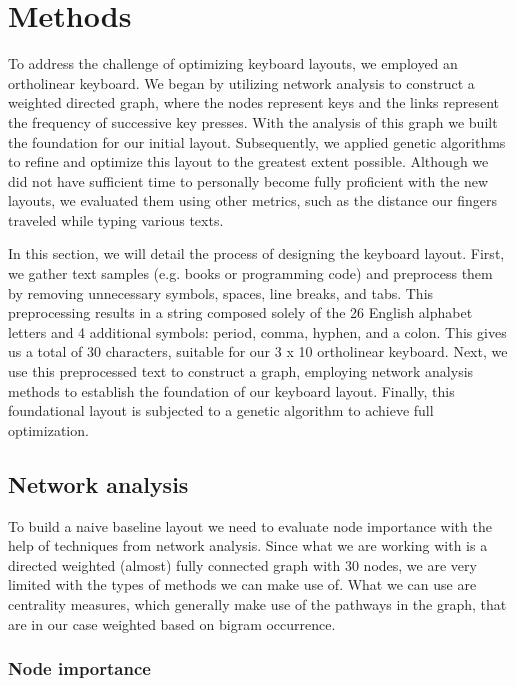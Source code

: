 \documentclass[9pt,twocolumn,twoside]{pnas-report}
\begin{document}
{\small

\section*{Methods}

To address the challenge of optimizing keyboard layouts, we employed an ortholinear keyboard.
We began by utilizing network analysis to construct a weighted directed graph, where the nodes represent keys and the links represent the frequency of successive key presses.
With the analysis of this graph we built the foundation for our initial layout.
Subsequently, we applied genetic algorithms to refine and optimize this layout to the greatest extent possible.
Although we did not have sufficient time to personally become fully proficient with the new layouts, we evaluated them using other metrics, such as the distance our fingers traveled while typing various texts.

In this section, we will detail the process of designing the keyboard layout.
First, we gather text samples (e.g. books or programming code) and preprocess them by removing unnecessary symbols, spaces, line breaks, and tabs.
This preprocessing results in a string composed solely of the 26 English alphabet letters and 4 additional symbols: period, comma, hyphen, and a colon.
This gives us a total of 30 characters, suitable for our 3 x 10 ortholinear keyboard.
Next, we use this preprocessed text to construct a graph, employing network analysis methods to establish the foundation of our keyboard layout.
Finally, this foundational layout is subjected to a genetic algorithm to achieve full optimization.

\subsection*{Network analysis}

To build a naive baseline layout we need to evaluate node importance with the help of techniques from network analysis.
Since what we are working with is a directed weighted (almost) fully connected graph with 30 nodes, we are very limited with the types of methods we can make use of.
What we can use are centrality measures, which generally make use of the pathways in the graph, that are in our case weighted based on bigram occurrence.

\subsubsection*{Node importance}

}
\end{document}
